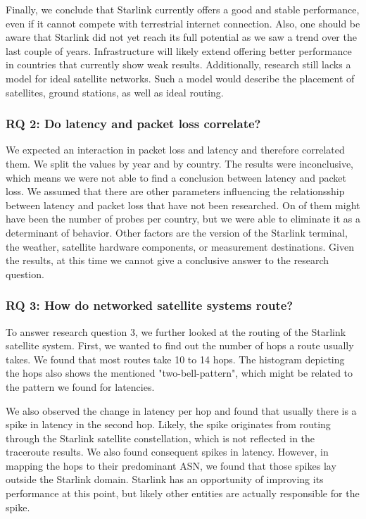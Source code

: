 Finally, we conclude that Starlink currently offers a good and stable
performance, even if it cannot compete with terrestrial internet connection.
Also, one should be aware that Starlink did not yet reach its full potential as
we saw a trend over the last couple of years. Infrastructure will likely
extend offering better performance in countries that currently show weak
results. Additionally, research still lacks a model for ideal satellite
networks. Such a model would describe the placement of satellites, ground
stations, as well as ideal routing.

\subsubsection*{RQ 2: Do latency and packet loss correlate?}

We expected an interaction in packet loss and latency and therefore correlated
them. We split the values by year and by country. The results were
inconclusive, which means we were not able to find a conclusion between latency
and packet loss. We assumed that there are other parameters influencing the
relationsship between latency and packet loss that have not been researched. On
of them might have been the number of probes per country, but we were able to
eliminate it as a determinant of behavior. Other factors are the version of the
Starlink terminal, the weather, satellite hardware components, or measurement
destinations. Given the results, at this time we cannot give a conclusive
answer to the research question.

\subsubsection*{RQ 3: How do networked satellite systems route?}

To answer research question 3, we further looked at the routing of the Starlink
satellite system. First, we wanted to find out the number of hops a route
usually takes. We found that most routes take 10 to 14 hops. The histogram
depicting the hops also shows the mentioned "two-bell-pattern", which might be
related to the pattern we found for latencies.

We also observed the change in latency per hop and found that usually there is
a spike in latency in the second hop. Likely, the spike originates from routing
through the Starlink satellite constellation, which is not reflected in the
traceroute results. We also found consequent spikes in latency. However, in
mapping the hops to their predominant ASN, we found that those spikes lay
outside the Starlink domain. Starlink has an opportunity of improving its
performance at this point, but likely other entities are actually responsible
for the spike.

